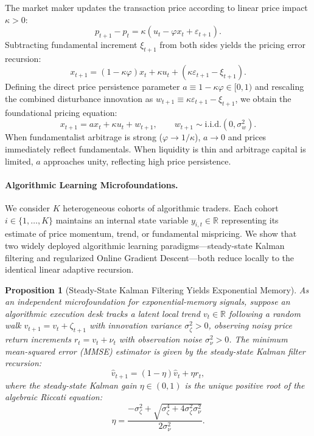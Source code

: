 \documentclass[12pt]{article}
\newtheorem{proposition}[theorem]{Proposition}
\theoremstyle{definition}
\theoremstyle{remark}
\newcommand{\R}{\mathbb{R}}
\begin{document}
The market maker updates the transaction price according to linear price impact $\kappa > 0$:
\begin{equation}
p_{t+1} - p_t = \kappa \left( u_t - \varphi x_t + \varepsilon_{t+1} \right).
\end{equation}
Subtracting fundamental increment $\xi_{t+1}$ from both sides yields the pricing error recursion:
\begin{equation}
x_{t+1} = (1 - \kappa \varphi) x_t + \kappa u_t + \left( \kappa \varepsilon_{t+1} - \xi_{t+1} \right).
\end{equation}
Defining the direct price persistence parameter $a \equiv 1 - \kappa \varphi \in [0, 1)$ and rescaling the combined disturbance innovation as $w_{t+1} \equiv \kappa \varepsilon_{t+1} - \xi_{t+1}$, we obtain the foundational pricing equation:
\begin{equation}
x_{t+1} = a x_t + \kappa u_t + w_{t+1}, \qquad w_{t+1} \sim \text{i.i.d.}(0, \sigma_w^2).
\label{eq:micro_pricing}
\end{equation}
When fundamentalist arbitrage is strong ($\varphi \to 1/\kappa$), $a \to 0$ and prices immediately reflect fundamentals. When liquidity is thin and arbitrage capital is limited, $a$ approaches unity, reflecting high price persistence.

\paragraph{Algorithmic Learning Microfoundations.}
We consider $K$ heterogeneous cohorts of algorithmic traders. Each cohort $i \in \{1, \dots, K\}$ maintains an internal state variable $y_{i,t} \in \R$ representing its estimate of price momentum, trend, or fundamental mispricing. We show that two widely deployed algorithmic learning paradigms—steady-state Kalman filtering and regularized Online Gradient Descent—both reduce locally to the identical linear adaptive recursion.

\begin{proposition}[Steady-State Kalman Filtering Yields Exponential Memory]
\label{prop:kalman}
As an independent microfoundation for exponential-memory signals, suppose an algorithmic execution desk tracks a latent local trend $v_t \in \R$ following a random walk $v_{t+1} = v_t + \zeta_{t+1}$ with innovation variance $\sigma_\zeta^2 > 0$, observing noisy price return increments $r_t = v_t + \nu_t$ with observation noise $\sigma_\nu^2 > 0$. The minimum mean-squared error (MMSE) estimator is given by the steady-state Kalman filter recursion:
\begin{equation}
\hat{v}_{t+1} = (1 - \eta) \hat{v}_t + \eta r_t,
\label{eq:kalman_recursion}
\end{equation}
where the steady-state Kalman gain $\eta \in (0, 1)$ is the unique positive root of the algebraic Riccati equation:
\begin{equation}
\eta = \frac{-\sigma_\zeta^2 + \sqrt{\sigma_\zeta^4 + 4 \sigma_\zeta^2 \sigma_\nu^2}}{2 \sigma_\nu^2}.
\end{equation}
\end{proposition}
\end{document}
